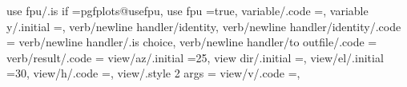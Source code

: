 {{{{{{{{{{{{{{{{{{{{{{{{{{{{{{{{{{{{{{{{{{{{{{{{{{{{{{{{{{{{{{{{{{{use fpu/.is if                                                     =pgfplots@usefpu,                                                                                                                   
use fpu                                                            =true,                                                                                                                              
variable/.code                                                     ={},                                                   
variable y/.initial                                                =\y,%
verb/newline handler/identity,
verb/newline handler/identity/.code                                =                                                                                                                                   
verb/newline handler/.is choice,
verb/newline handler/to outfile/.code                              =                                                                                                                                   
verb/result/.code                                                  ={%
view/az/.initial                                                   =25,%
view dir/.initial                                                  =,%
view/el/.initial                                                   =30,%
view/h/.code                                                       ={},%
view/.style 2 args                                                 ={%
view/v/.code                                                       ={},%
}}}}}}}}}}}}}}}}}}}}}}}}}}}}}}}}}}}}}}}}}}}}}}}}}}}}}}}}}}}}}}}}}}}}}
